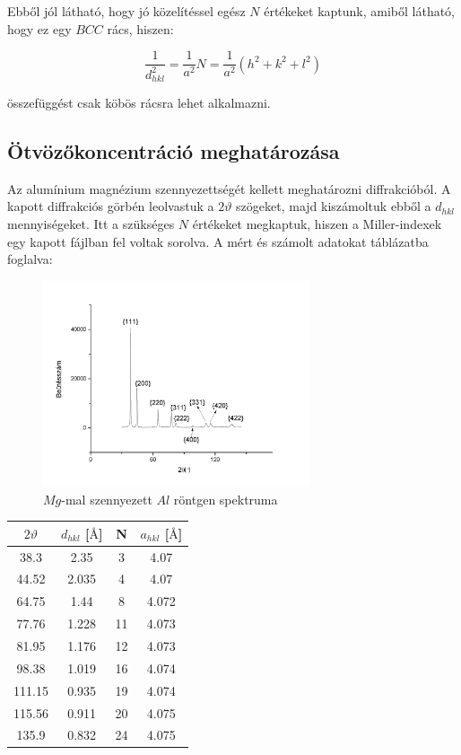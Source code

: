 \documentclass[a4paper,12pt]{article}
\begin{document}
\par Ebből jól látható, hogy jó közelítéssel egész $N$ értékeket kaptunk, amiből látható, hogy ez egy $BCC$ rács, hiszen:

\begin{equation*}
\frac{1}{d_{hkl}^{2}} = \frac{1}{a^{2}}N = \frac{1}{a^{2}}(h^{2} + k^{2} + l^{2})
\end{equation*}

\par összefüggést csak köbös rácsra lehet alkalmazni.

\subsection{Ötvözőkoncentráció meghatározása}

\par Az alumínium magnézium szennyezettségét kellett meghatározni diffrakcióból. A kapott diffrakciós görbén leolvastuk a $2\vartheta$ szögeket, majd kiszámoltuk ebből a $d_{hkl}$ mennyiségeket. Itt a szükséges $N$ értékeket megkaptuk, hiszen a Miller-indexek egy kapott fájlban fel voltak sorolva. A mért és számolt adatokat táblázatba foglalva:

\begin{figure}[H]
\centering
\includegraphics[width=0.7\textwidth]{./fel2.png}
\caption{$Mg$-mal szennyezett $Al$ röntgen spektruma}
\end{figure} 

\begin{center}
\begin{tabular}{|c|c|c|c|}
\hline
$2\vartheta$ & $d_{hkl}$ [$\si{\angstrom}$] & N & $a_{hkl}$ [$\si{\angstrom}$] \\
\hline
38.3 &2.35 & 3 & 4.07\\
\hline
44.52 & 2.035 & 4 & 4.07 \\
\hline
64.75 & 1.44 & 8 & 4.072\\
\hline
77.76 & 1.228 & 11 & 4.073\\
\hline
81.95 & 1.176 & 12 & 4.073 \\
\hline
98.38 & 1.019 & 16 & 4.074\\
\hline
111.15 & 0.935 & 19 & 4.074\\
\hline
115.56 & 0.911 & 20 & 4.075\\
\hline
135.9 & 0.832 & 24 & 4.075\\
\hline
\end{tabular}
\end{center}
\end{document}
